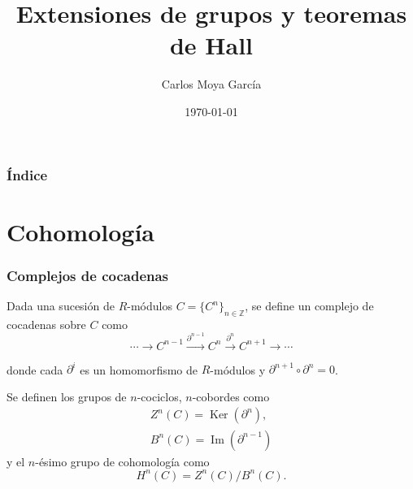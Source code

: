 \documentclass[
	11pt, %
]{beamer}
\title[]{Extensiones de grupos y teoremas de Hall}
\author{Carlos Moya García}
\institute[]{Universidad del País Vasco}
\date{\today}
\DeclareMathOperator{\Image}{Im}
\DeclareMathOperator{\Ker}{Ker}
\begin{document}
\begin{frame}
	\titlepage
\end{frame}

\begin{frame}
	\frametitle{Índice} %
	
	\tableofcontents %
\end{frame}


\section{Cohomología}

\begin{frame}
	\frametitle{Complejos de cocadenas}
	Dada una sucesión de $R$-módulos $C = \{C^n\}_{n\in\mathbb Z}$, se define un complejo de cocadenas sobre $C$ como
	\begin{equation*}
		\cdots  \xrightarrow{} C^{n-1} \xrightarrow{\partial^{n-1}} C^n \xrightarrow{\partial^n} C^{n+1} \xrightarrow{} \cdots 
	\end{equation*}
	
	donde cada $\partial^{i}$ es un homomorfismo de $R$-módulos y $\partial^{n+1}\circ \partial^n = 0$.
	\bigskip
	\pause
	
	Se definen los grupos de $n$-cociclos, $n$-cobordes como
	\begin{gather*}
		Z^n(C) = \Ker(\partial^n), \\
		B^n(C) = \Image(\partial^{n-1})
	\end{gather*}
	y el $n$-ésimo grupo de cohomología como
	\begin{equation*}
		H^n(C) = Z^n(C)/B^n(C).
	\end{equation*}
	
\end{frame}
\end{document}
